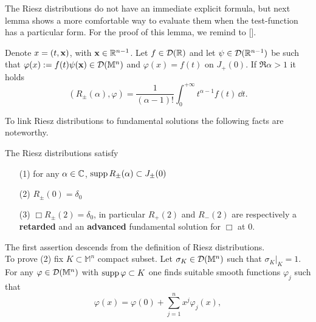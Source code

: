 \noindent The Riesz distributions do not have an immediate explicit formula, but next lemma shows a more comfortable way to evaluate them when the test-function has a particular form. For the proof of this lemma, we remind to [\citealp[Lem 1.3.30]{bar2}].
\begin{lem}
	Denote $x=(t,\mathbf{x})$, with $\mathbf{x}\in{\mathbb R}^{n-1}$. Let $f\in\mathcal{D}({\mathbb R})$ and let $\psi\in\mathcal{D}({\mathbb R}^{n-1})$ be such that $\varphi(x):=f(t)\psi(\mathbf{x})\in\mathcal{D}(\mathbb{M}^n)$ and $\varphi(x)=f(t)$ on $J_+(0)$. If $\Re\alpha>1$ it holds
	\begin{equation*}
		(R_\pm(\alpha),\varphi)=\frac{1}{(\alpha-1)!}\int_{0}^{+\infty}t^{\alpha-1}f(t)\,\dd t.
	\end{equation*}
\label{lem:Rieszevaluate}
\end{lem}
\noindent To link Riesz distributions to fundamental solutions the following facts are noteworthy.

\begin{prop}
	The Riesz distributions satisfy
	\begin{enumerate}
		\item[(1)] for any $\alpha\in{\mathbb C}$, $\text{supp}\,R_\pm(\alpha)\subset J_\pm(0)$
		\item[(2)] $R_\pm(0)=\delta_0$
		\item[(3)] $\Box R_\pm(2)=\delta_0$, in particular $R_+(2)$  and $R_-(2)$ are respectively a \textbf{retarded} and an \textbf{advanced} fundamental solution for $\Box$ at $0$.
	\end{enumerate}
\label{prop:secondRiesz}
\end{prop}
\Proof The first assertion descends from the definition of Riesz distributions.\\
To prove (2) fix $K\subset\mathbb{M}^n$ compact subset. Let $\sigma_K\in\mathcal{D}(\mathbb{M}^n)$ such that $\sigma_K|_K=1$. For any $\varphi\in\mathcal{D}(\mathbb{M}^n)$ with $\text{supp}\,\varphi\subset K$ one finds suitable smooth functions $\varphi_j$ such that
\[\varphi(x)=\varphi(0)+\sum_{j=1}^{n}x^j\varphi_j(x),	\]

